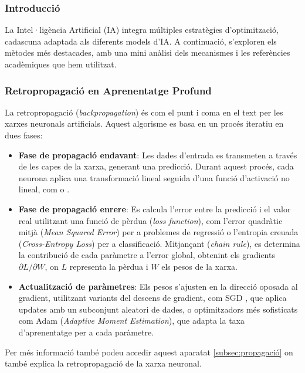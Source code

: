 {\subsubsection{Introducció}
La Intel·ligència Artificial (IA) integra múltiples estratègies d'optimització, cadascuna adaptada als diferents models d'IA. A continuació, s'exploren els mètodes més destacades, amb una mini anàlisi dels mecanismes i les referències acadèmiques que hem utilitzat.

\subsubsection{Retropropagació en Aprenentatge Profund}
La retropropagació (\textit{backpropagation}) és com el punt i coma en el text per les xarxes neuronals artificials. Aquest algorisme es basa en un procés iteratiu en dues fases:

\begin{itemize}
\item \textbf{Fase de propagació endavant}: Les dades d'entrada es transmeten a través de les capes de la xarxa, generant una predicció. Durant aquest procés, cada neurona aplica una transformació lineal seguida d'una funció d'activació no lineal, com \textit{} o \textit{}.

\item \textbf{Fase de propagació enrere}: Es calcula l'error entre la predicció i el valor real utilitzant una funció de pèrdua (\textit{loss function}), com l'error quadràtic mitjà (\textit{Mean Squared Error}) per a problemes de regressió o l'entropia creuada (\textit{Cross-Entropy Loss}) per a classificació. Mitjançant  (\textit{chain rule}), es determina la contribució de cada paràmetre a l'error global, obtenint els gradients $\partial L/\partial W$, on $L$ representa la pèrdua i $W$ els pesos de la xarxa.

\item \textbf{Actualització de paràmetres}: Els pesos s'ajusten en la direcció oposada al gradient, utilitzant variants del descens de gradient, com SGD \textit{}, que aplica updates amb un subconjunt aleatori de dades, o optimitzadors més sofisticats com Adam (\textit{Adaptive Moment Estimation}), que adapta la taxa d'aprenentatge per a cada paràmetre.
\end{itemize}

Per més informació també podeu accedir aquest  aparatat \ref{subsec:propagació} on també explica la retropropagació de la xarxa neuronal.

}
